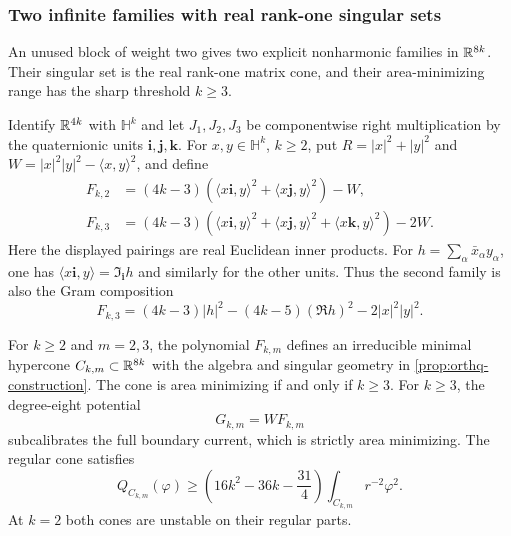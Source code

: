 \subsubsection{Two infinite families with real rank-one singular sets}
\label{sec:orthq-families}

An unused block of weight two gives two explicit nonharmonic
families in $\mathbb R^{8k}$. Their singular set is the real rank-one
matrix cone, and their area-minimizing range has the sharp threshold
$k\ge3$.

Identify $\mathbb R^{4k}$ with $\mathbb H^k$ and let $J_1,J_2,J_3$ be
componentwise right multiplication by the quaternionic units
$\mathbf i,\mathbf j,\mathbf k$. For $x,y\in\mathbb H^k$, $k\ge2$, put
$R=|x|^2+|y|^2$ and $W=|x|^2|y|^2-\langle x,y\rangle^2$, and define
\begin{align}
 F_{k,2}&=(4k-3)
  (\langle x\mathbf i,y\rangle^2+\langle x\mathbf j,y\rangle^2)-W,
  \label{eq:orthq-two-families}\\
 F_{k,3}&=(4k-3)
  (\langle x\mathbf i,y\rangle^2+\langle x\mathbf j,y\rangle^2
                         +\langle x\mathbf k,y\rangle^2)-2W.
  \nonumber
\end{align}
Here the displayed pairings are real Euclidean inner products.
For $h=\sum_\alpha\bar x_\alpha y_\alpha$, one has
$\langle x\mathbf i,y\rangle=\Im_{\mathbf i}h$ and similarly for
the other units. Thus the second family is also the Gram composition
\begin{equation}\label{eq:orthq-quaternionic-Gram}
 F_{k,3}=(4k-3)|h|^2-(4k-5)(\Re h)^2-2|x|^2|y|^2.
\end{equation}

\begin{theorem}
\label{thm:orthq-infinite-families}
For $k\ge2$ and $m=2,3$, the polynomial $F_{k,m}$ defines an
irreducible minimal hypercone $C_{k,m}\subset\mathbb R^{8k}$ with the
algebra and singular geometry in \cref{prop:orthq-construction}.
The cone is area minimizing if and only if $k\ge3$.
For $k\ge3$, the degree-eight potential
\begin{equation}\label{eq:orthq-potential}
 G_{k,m}=WF_{k,m}
\end{equation}
subcalibrates the full boundary current, which is strictly area
minimizing. The regular cone satisfies
\begin{equation}\label{eq:orthq-Hardy}
 Q_{C_{k,m}}(\varphi)\ge
 \left(16k^2-36k-\frac{31}{4}\right)
 \int_{C_{k,m}}r^{-2}\varphi^2.
\end{equation}
At $k=2$ both cones are unstable on their regular parts.
\end{theorem}

